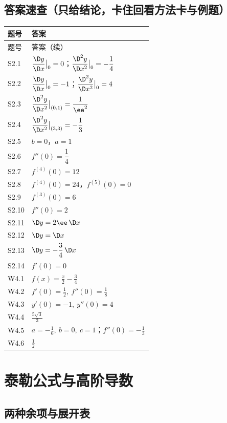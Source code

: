 \documentclass[11pt,a4paper]{ctexart}
\begin{document}
\subsection{答案速查（只给结论，卡住回看方法卡与例题）}
{\footnotesize
\begin{longtable}{@{}p{1.6cm}p{13.0cm}@{}}
\toprule 题号 & 答案 \\ \midrule
\endfirsthead
\toprule 题号 & 答案（续） \\ \midrule
\endhead
\midrule
\endfoot
\bottomrule
\endlastfoot
S2.1 & $\dfrac{\D y}{\D x}\big|_{0}=0$；$\dfrac{\D^{2}y}{\D x^{2}}\big|_{0}=-\dfrac{1}{4}$ \\
S2.2 & $\dfrac{\D y}{\D x}\big|_{0}=-1$；$\dfrac{\D^{2}y}{\D x^{2}}\big|_{0}=4$ \\
S2.3 & $\dfrac{\D^{2}y}{\D x^{2}}\big|_{(0,1)}=\dfrac{1}{\ee^{2}}$ \\
S2.4 & $\dfrac{\D^{2}y}{\D x^{2}}\big|_{(3,3)}=-\dfrac{1}{3}$ \\
S2.5 & $b=0$，$a=1$ \\
S2.6 & $f''(0)=\dfrac{1}{4}$ \\
S2.7 & $f^{(4)}(0)=12$ \\
S2.8 & $f^{(4)}(0)=24$，$f^{(5)}(0)=0$ \\
S2.9 & $f^{(3)}(0)=6$ \\
S2.10 & $f''(0)=2$ \\
S2.11 & $\D y=2\ee\,\D x$ \\
S2.12 & $\D y=\D x$ \\
S2.13 & $\D y=-\dfrac{3}{4}\,\D x$ \\
S2.14 & $f'(0)=0$ \\
W4.1 & $f(x)=\frac x2-\frac34$ \\
W4.2 & $f'(0)=\frac12,\ f''(0)=\frac18$ \\
W4.3 & $y'(0)=-1,\ y''(0)=4$ \\
W4.4 & $\frac{5\sqrt3}{3}$ \\
W4.5 & $a=-\frac16,\ b=0,\ c=1$；$f''(0)=-\frac13$ \\
W4.6 & $\frac12$
\end{longtable}}

\bigskip
\section{泰勒公式与高阶导数}
\subsection{两种余项与展开表}
\end{document}
